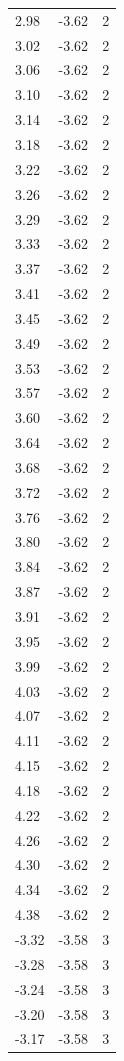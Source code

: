 \begin{longtable}{lrr}
  2.98 & -3.62 & 2 \\
  3.02 & -3.62 & 2 \\
  3.06 & -3.62 & 2 \\
  3.10 & -3.62 & 2 \\
  3.14 & -3.62 & 2 \\
  3.18 & -3.62 & 2 \\
  3.22 & -3.62 & 2 \\
  3.26 & -3.62 & 2 \\
  3.29 & -3.62 & 2 \\
  3.33 & -3.62 & 2 \\
  3.37 & -3.62 & 2 \\
  3.41 & -3.62 & 2 \\
  3.45 & -3.62 & 2 \\
  3.49 & -3.62 & 2 \\
  3.53 & -3.62 & 2 \\
  3.57 & -3.62 & 2 \\
  3.60 & -3.62 & 2 \\
  3.64 & -3.62 & 2 \\
  3.68 & -3.62 & 2 \\
  3.72 & -3.62 & 2 \\
  3.76 & -3.62 & 2 \\
  3.80 & -3.62 & 2 \\
  3.84 & -3.62 & 2 \\
  3.87 & -3.62 & 2 \\
  3.91 & -3.62 & 2 \\
  3.95 & -3.62 & 2 \\
  3.99 & -3.62 & 2 \\
  4.03 & -3.62 & 2 \\
  4.07 & -3.62 & 2 \\
  4.11 & -3.62 & 2 \\
  4.15 & -3.62 & 2 \\
  4.18 & -3.62 & 2 \\
  4.22 & -3.62 & 2 \\
  4.26 & -3.62 & 2 \\
  4.30 & -3.62 & 2 \\
  4.34 & -3.62 & 2 \\
  4.38 & -3.62 & 2 \\
  -3.32 & -3.58 & 3 \\
  -3.28 & -3.58 & 3 \\
  -3.24 & -3.58 & 3 \\
  -3.20 & -3.58 & 3 \\
  -3.17 & -3.58 & 3 \\

\end{longtable}
